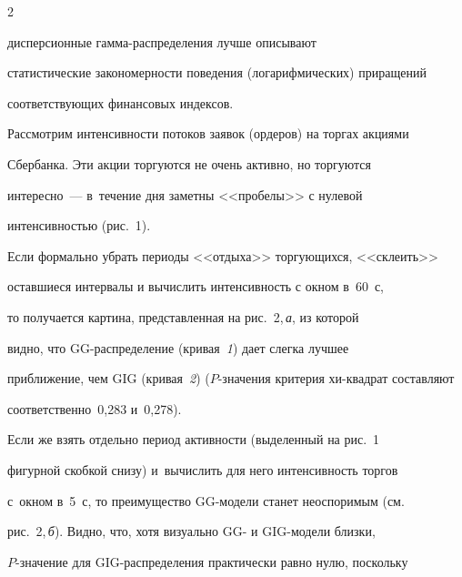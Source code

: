 \begin{multicols}{2}





\noindent


 дисперсионные гам\-ма-рас\-пре\-де\-ле\-ния лучше описывают


статистические закономерности поведения (логарифмических) приращений


соответствующих финансовых индексов.





Рассмотрим интенсивности потоков заявок (ордеров) на торгах акциями


Сбербанка. Эти акции торгуются не очень активно, но торгуются


интересно~--- в~течение дня заметны <<пробелы>> с нулевой


интенсивностью  (рис.~1).











Если формально убрать периоды <<отдыха>> торгующихся, <<склеить>>


оставшиеся интервалы и вычислить интенсивность с окном в~60~с,


то получается картина, представленная на рис.~2,\,\textit{а}, из которой


видно, что GG-рас\-пре\-де\-ле\-ние (кривая~\textit{1}) дает слегка лучшее


приближение, чем GIG (кривая~\textit{2}) ($P$-зна\-че\-ния критерия хи-квад\-рат составляют


соответственно~0,283 и~0,278).











Если же взять отдельно период активности (выделенный на рис.~1


фигурной скобкой снизу) и~вычислить для него интенсивность торгов 


с~окном в~5~с, то преимущество GG-мо\-де\-ли станет не\-оспо\-римым (см.\


рис.~2,\,\textit{б}). Видно, что, хотя визуально GG- и GIG-мо\-де\-ли близки,


$P$-значение для GIG-рас\-пре\-де\-ле\-ния практически равно нулю, поскольку



\end{multicols}
